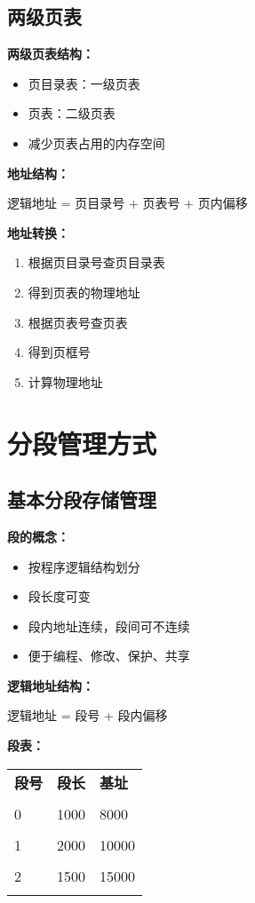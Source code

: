 \documentclass[lang=cn,newtx,10pt,scheme=chinese]{../../elegantbook}
\begin{document}
\subsection{两级页表}

\textbf{两级页表结构：}
\begin{itemize}
  \item 页目录表：一级页表
  \item 页表：二级页表
  \item 减少页表占用的内存空间
\end{itemize}

\textbf{地址结构：}
\begin{center}
逻辑地址 = 页目录号 + 页表号 + 页内偏移
\end{center}

\textbf{地址转换：}
\begin{enumerate}
  \item 根据页目录号查页目录表
  \item 得到页表的物理地址
  \item 根据页表号查页表
  \item 得到页框号
  \item 计算物理地址
\end{enumerate}

\section{分段管理方式}

\subsection{基本分段存储管理}

\textbf{段的概念：}
\begin{itemize}
  \item 按程序逻辑结构划分
  \item 段长度可变
  \item 段内地址连续，段间可不连续
  \item 便于编程、修改、保护、共享
\end{itemize}

\textbf{逻辑地址结构：}
\begin{center}
逻辑地址 = 段号 + 段内偏移
\end{center}

\textbf{段表：}
\begin{longtable}{@{}p{3cm}p{3cm}p{3cm}@{}}
\toprule
\textbf{段号} & \textbf{段长} & \textbf{基址} \\\\ \midrule
\endhead

0 & 1000 & 8000 \\\\
1 & 2000 & 10000 \\\\
2 & 1500 & 15000 \\\\

\bottomrule
\end{longtable}
\end{document}
